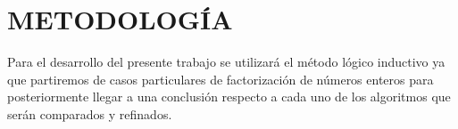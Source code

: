     \section{METODOLOGÍA}
    Para el desarrollo del presente trabajo se utilizará el método lógico inductivo ya que partiremos de casos particulares de factorización de números enteros para posteriormente llegar a una conclusión respecto a cada uno de los algoritmos que serán comparados y refinados.
    